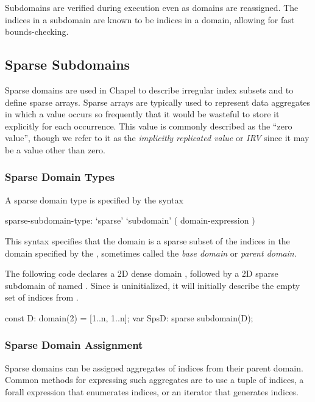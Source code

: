 Subdomains are verified during execution even as domains are
reassigned.  The indices in a subdomain are known to be indices in a
domain, allowing for fast bounds-checking.

\subsection{Sparse Subdomains}
\label{Sparse_Subdomains}

Sparse domains are used in Chapel to describe irregular index subsets
and to define sparse arrays.  Sparse arrays are typically used to
represent data aggregates in which a value occurs so frequently that
it would be wasteful to store it explicitly for each occurrence.  This
value is commonly described as the ``zero value'', though we refer to
it as the \emph{implicitly replicated value} or \emph{IRV} since it
may be a value other than zero.

\subsubsection{Sparse Domain Types}

A sparse domain type is specified by the syntax
\begin{syntax}
sparse-subdomain-type:
  `sparse' `subdomain' ( domain-expression )
\end{syntax}
This syntax specifies that the domain is a sparse subset of the
indices in the domain specified by the ,
sometimes called the \emph{base domain} or \emph{parent domain}.

\begin{example}
The following code declares a 2D dense domain , followed by a
2D sparse subdomain of  named .  Since 
is uninitialized, it will initially describe the empty set of indices
from .
\begin{chapel}
const D: domain(2) = [1..n, 1..n];
var SpsD: sparse subdomain(D);
\end{chapel}
\end{example}


\subsubsection{Sparse Domain Assignment}

Sparse domains can be assigned aggregates of indices from their parent
domain.  Common methods for expressing such aggregates are to use a
tuple of indices, a forall expression that enumerates indices, or an
iterator that generates indices.

